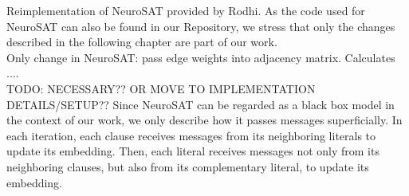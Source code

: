 Reimplementation of NeuroSAT provided by Rodhi. As the code used for NeuroSAT can also be found in our Repository, we stress that only the changes described in the following chapter are part of our work. \\


Only change in NeuroSAT: pass edge weights into adjacency matrix. Calculates .... \\



TODO: NECESSARY?? OR MOVE TO IMPLEMENTATION DETAILS/SETUP??
Since NeuroSAT can be regarded as a black box model in the context of our work, we only describe how it passes messages superficially. In each iteration, each clause receives messages from its neighboring literals to update its embedding. Then, each literal receives messages not only from its neighboring clauses, but also from its complementary literal, to update its embedding.